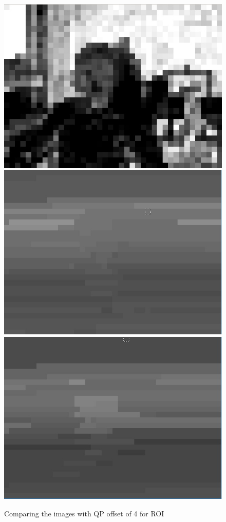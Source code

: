 \documentclass[11pt]{article} %
\begin{document}
\begin{figure}[!h]
    \includegraphics[scale=0.4]{QPOffset/paul120_250kbps_QPoffset4_psnr}
    \includegraphics[scale=0.37]{PaulDefault120_91250kbps_quant}
    \includegraphics[scale=0.4]{QPOffset/paul120_250kbps_QPoffset4_quant}    
    \caption{Comparing the images with QP offset of 4 for ROI}
    \label{fig:Default_QPOffsetCompare}
\end{figure}
\fi
\end{document}
